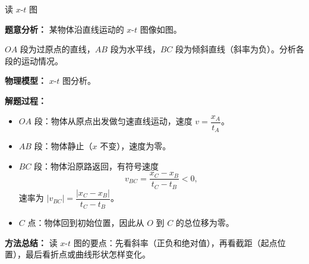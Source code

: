 \begin{examplebox}{读 $x$-$t$ 图}

\textbf{题意分析：} 某物体沿直线运动的 $x$-$t$ 图像如图。

\begin{center}


\label{fig:xt-brokenline}
\end{center}

$OA$ 段为过原点的直线，$AB$ 段为水平线，$BC$ 段为倾斜直线（斜率为负）。分析各段的运动情况。

\textbf{物理模型：} $x$-$t$ 图分析。

\textbf{解题过程：}
\begin{itemize}
  \item $OA$ 段：物体从原点出发做匀速直线运动，速度 $v = \dfrac{x_A}{t_A}$。
  \item $AB$ 段：物体静止（$x$ 不变），速度为零。
  \item $BC$ 段：物体沿原路返回，有符号速度
  \[
  v_{BC}=\frac{x_C-x_B}{t_C-t_B}<0,
  \]
  速率为 $\lvert v_{BC}\rvert=\dfrac{|x_C-x_B|}{t_C-t_B}$。
  \item $C$ 点：物体回到初始位置，因此从 $O$ 到 $C$ 的总位移为零。
\end{itemize}

\textbf{方法总结：} 读 $x$-$t$ 图的要点：先看斜率（正负和绝对值），再看截距（起点位置），最后看折点或曲线形状怎样变化。

\end{examplebox}

